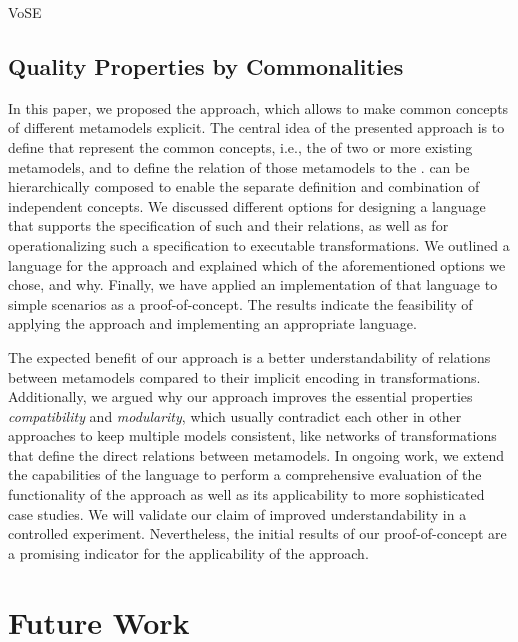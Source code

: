 \begin{copiedFrom}{VoSE}

\subsection*{Quality Properties by Commonalities}

In this paper, we proposed the \commonalities approach, which allows to make common concepts of different metamodels explicit.
The central idea of the presented approach 
is to define \emph{\conceptmetamodels} that represent the common concepts, i.e., the \commonalities of two or more existing metamodels, and to define the relation of those metamodels to the \conceptmetamodels.
\Conceptmetamodels can be hierarchically composed to enable the separate definition and combination of independent concepts.
We discussed different options for designing a language that supports the specification of such \commonalities and their relations, 
as well as for operationalizing such a specification to executable transformations.
We outlined a language for the \commonalities approach and explained %
which of the aforementioned options we chose, and why.
Finally, we have applied an implementation of that language to simple scenarios as a proof-of-concept.
The results indicate the feasibility of applying the \commonalities approach and implementing an appropriate language.

The expected benefit of our approach is a better understandability of relations between metamodels compared to their implicit encoding in transformations.
Additionally, we argued why our approach improves the essential properties \emph{compatibility} and \emph{modularity}, which usually contradict each other in other approaches to keep multiple models consistent, like networks of transformations that define the direct relations between metamodels.
In ongoing work, we extend the capabilities of the language to perform a comprehensive evaluation of the functionality of the approach as well as its applicability to more sophisticated case studies.
We will validate our claim of improved understandability in a controlled experiment.
Nevertheless, the initial results of our proof-of-concept are a promising indicator for the applicability of the \commonalities approach.

\end{copiedFrom} %



\section{Future Work}